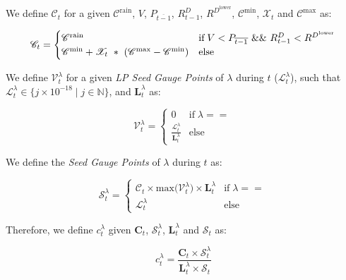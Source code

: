 \documentclass[tikz]{article}
\newcommand{\term}[1]{\textsl{#1}}
\newcommand{\Pinto}{} %
\begin{document}
We define $\mathscr{C}_{t}$ for a given $\mathscr{C}^{\text{rain}}$, $V$, $P_{\overline{t-1}}$, $R_{t-1}^{D}$, $R^{D^{\text{lower}}}$, $\mathscr{C}^{\text{min}}$, $\mathscr{X}_{t}$ and $\mathscr{C}^{\text{max}}$ as:

    $$ 
        \mathscr{C}_{t} = 
        \begin{cases}
            {\mathscr{C}^{\text{rain}}} 
                & \text{if} \; V < P_{\overline{t-1}} \mkern6mu \&\& \mkern6mu R_{t-1}^{D} < R^{D^{\text{lower}}} \\
            
            {\mathscr{C}^{\text{min}} + \mathscr{X}_{t}\ * \ (\mathscr{C}^{\text{max}} - \mathscr{C}^{\text{min}})} 
                & \text{else}
        \end{cases} 
    $$

We define $\mathscr{V}_{t}^{\lambda}$ for a given \term{LP Seed Gauge Points} of $\lambda$ during $t$ ($\mathscr{L}_{t}^{\lambda}$), such that $\mathscr{L}_{t}^{\lambda} \in \{j \times 10^{-18} \mid j \in \mathbb{N} \}$, and $\mathbf{L}_{t}^{\lambda}$ as:

    $$
        \mathscr{V}_{t}^{\lambda} = 
        \begin{cases}
            0 
                & \text{if} \; \lambda == \Pinto  \\
            
            \frac{\mathscr{L}_{t}^{\lambda}}{\mathbf{L}_{t}^{\lambda}} 
                & \text{else}
        \end{cases} 
    $$

We define the \term{Seed Gauge Points} of $\lambda$ during $t$ as:

    $$ 
        \mathscr{S}_{t}^\lambda =
        \begin{cases}
            {\mathscr{C}_{t} \times \text{max(}\mathscr{V}_{t}^\lambda\text{)} \times \mathbf{L}_{t}^{\lambda}} 
                & \text{if} \; \lambda == \Pinto  \\
            
            {\mathscr{L}_{t}^{\lambda}} 
                & \text{else}
        \end{cases} 
    $$

Therefore, we define $c_{t}^{\lambda}$ given $\mathbf{C}_{t}$, $\mathscr{S}_{t}^{\lambda}$, $\mathbf{L}_{t}^{\lambda}$ and $\mathscr{S}_{t}$ as: 

    $$
        c_{t}^{\lambda} = \frac{\mathbf{C}_{t} \times \mathscr{S}_{t}^{\lambda}}
                                {\mathbf{L}_{t}^{\lambda} \times \mathscr{S}_{t}}
    $$
\end{document}
